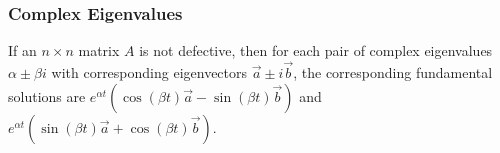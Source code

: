 \subsubsection{Complex Eigenvalues}
\begin{theorem}
	If an $n \times n$ matrix $A$ is not defective, then for each pair of complex eigenvalues $\alpha \pm \beta i$ with corresponding eigenvectors $\vec{a} \pm i\vec{b}$, the corresponding fundamental solutions are $e^{\alpha t}\left(\cos{(\beta t)}\vec{a}-\sin{(\beta t)\vec{b}}\right)$ and $e^{\alpha t}\left(\sin{(\beta t)}\vec{a}+\cos{(\beta t)\vec{b}}\right)$.
\end{theorem}

